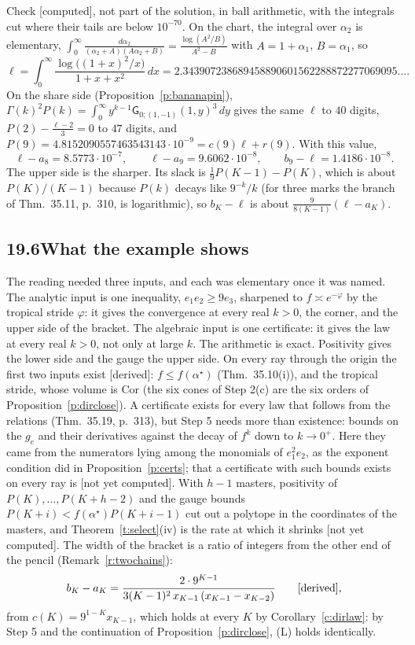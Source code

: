 \documentclass[11pt]{article}
\newcommand{\sG}{\mathsf G}
\theoremstyle{plain}
\theoremstyle{definition}
\theoremstyle{remark}
\newcommand{\derived}{\textup{[derived]}}
\newcommand{\computed}{\textup{[computed]}}
\newcommand{\notyet}{\textup{[not yet computed]}}
\begin{document}
\noindent Check \computed, not part of the solution, in ball arithmetic, with the integrals cut where their tails are below $10^{-70}$. On the chart, the integral over $\alpha_2$ is elementary, $\int_0^\infty\frac{d\alpha_2}{(\alpha_2+A)(A\alpha_2+B)}=\frac{\log(A^2/B)}{A^2-B}$ with $A=1+\alpha_1$, $B=\alpha_1$, so
\[
\ell=\int_0^\infty\frac{\log\big((1+x)^2/x\big)}{1+x+x^2}\,dx=2.343907238689458890601562288872277069095\ldots .
\]
On the share side (Proposition~\ref{p:bananapin}), $\Gamma(k)^2P(k)=\int_0^\infty y^{k-1}\sG_{0;(1,-1)}(1,y)^3\,dy$ gives the same $\ell$ to $40$ digits, $P(2)-\frac{\ell-2}3=0$ to $47$ digits, and $P(9)=4.8152090557463543143\cdot10^{-9}=c(9)\ell+r(9)$. With this value,
\[
\ell-a_8=8.5773\cdot10^{-7},\qquad \ell-a_9=9.6062\cdot10^{-8},\qquad b_9-\ell=1.4186\cdot10^{-8}.
\]
The upper side is the sharper. Its slack is $\frac19P(K-1)-P(K)$, which is about $P(K)/(K-1)$ because $P(k)$ decays like $9^{-k}/k$ (for three marks the branch of Thm.~35.11, p.~310, is logarithmic), so $b_K-\ell$ is about $\frac9{8(K-1)}(\ell-a_K)$.

\subsection*{19.6\quad What the example shows}

The reading needed three inputs, and each was elementary once it was named. The analytic input is one inequality, $e_1e_2\ge9e_3$, sharpened to $f\asymp e^{-\varphi}$ by the tropical stride $\varphi$: it gives the convergence at every real $k>0$, the corner, and the upper side of the bracket. The algebraic input is one certificate: it gives the law at every real $k>0$, not only at large $k$. The arithmetic is exact. Positivity gives the lower side and the gauge the upper side. On every ray through the origin the first two inputs exist \derived: $f\le f(\alpha^\star)$ (Thm.~35.10(i)), and the tropical stride, whose volume is $\mathrm{Cor}$ (the six cones of Step 2(c) are the six orders of Proposition~\ref{p:dirclose}). A certificate exists for every law that follows from the relations (Thm.~35.19, p.~313), but Step 5 needs more than existence: bounds on the $g_e$ and their derivatives against the decay of $f^k$ down to $k\to0^+$. Here they came from the numerators lying among the monomials of $e_1^2e_2$, as the exponent condition did in Proposition~\ref{p:certs}; that a certificate with such bounds exists on every ray is \notyet. With $h-1$ masters, positivity of $P(K),\dots,P(K+h-2)$ and the gauge bounds $P(K+i)<f(\alpha^\star)P(K+i-1)$ cut out a polytope in the coordinates of the masters, and Theorem~\ref{t:select}(iv) is the rate at which it shrinks \notyet. The width of the bracket is a ratio of integers from the other end of the pencil (Remark~\ref{r:twochains}):
\[
b_K-a_K=\frac{2\cdot9^{K-1}}{3(K-1)^2\,x_{K-1}\,(x_{K-1}-x_{K-2})}\qquad\derived,
\]
from $c(K)=9^{1-K}x_{K-1}$, which holds at every $K$ by Corollary~\ref{c:dirlaw}: by Step 5 and the continuation of Proposition~\ref{p:dirclose}, (L) holds identically.
\end{document}
